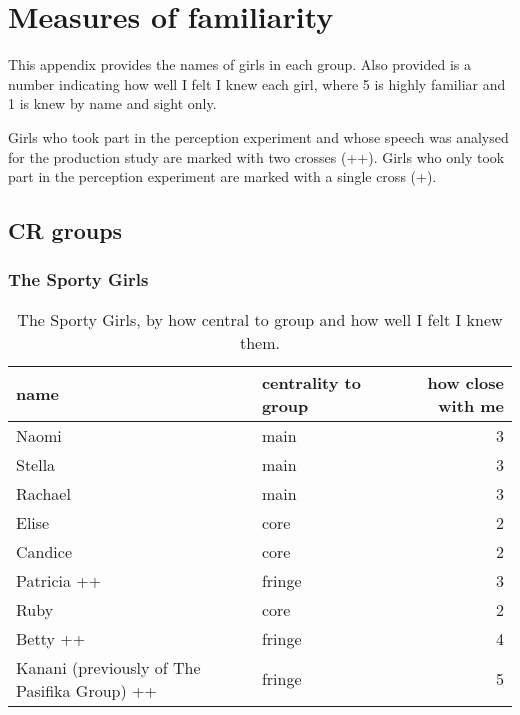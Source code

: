 %


%
\chapter{Measures of familiarity}\label{app:socialgroups}
\noindent This appendix provides the names of girls in each group.  Also provided is a number indicating how well I felt I knew each girl, where 5 is highly familiar and 1 is knew by name and sight only. 

Girls who took part in the perception experiment and whose speech was analysed for the production study are marked with two crosses (++).  Girls who only took part in the perception experiment are marked with a single cross (+).


\section{CR groups}

\subsection{The Sporty Girls}
\nopagebreak
\begin{table}[ht]
\caption{The Sporty Girls, by how central to group and how well I felt I knew them.}\label{append:Sporty}
	\centering
		\begin{tabular}{llr} \\
		\hline
		
			name & centrality to group & how close with me  \\
			\hline
Naomi   & main & 3 \\
Stella  & main & 3 \\
Rachael & main & 3 \\
Elise   & core & 2 \\
Candice & core & 2 \\
Patricia ++ & fringe & 3 \\
Ruby    & core &  2 \\
Betty  ++  & fringe & 4 \\
Kanani (previously of The Pasifika Group) ++  & fringe & 5 \\
   \hline
		\end{tabular}
\end{table}

